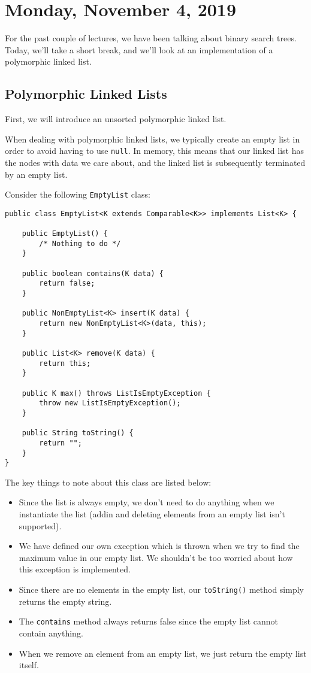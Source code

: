 \section{Monday, November 4, 2019}

For the past couple of lectures, we have been talking about binary search trees. Today, we'll take a short break, and we'll look at an implementation of a polymorphic linked list.

\subsection{Polymorphic Linked Lists}

First, we will introduce an unsorted polymorphic linked list.

When dealing with polymorphic linked lists, we typically create an empty list in order to avoid having to use \verb!null!. In memory, this means that our linked list has the nodes with data we care about, and the linked list is subsequently terminated by an empty list. 

Consider the following \verb!EmptyList! class:


\begin{lstlisting}
public class EmptyList<K extends Comparable<K>> implements List<K> {
	
	public EmptyList() {
		/* Nothing to do */
	}
	
	public boolean contains(K data) {
		return false;
	}

	public NonEmptyList<K> insert(K data) {
		return new NonEmptyList<K>(data, this);
	}

	public List<K> remove(K data) {
		return this;
	}

	public K max() throws ListIsEmptyException {
		throw new ListIsEmptyException();
	}
	
	public String toString() {
		return "";
	}
}
\end{lstlisting}

The key things to note about this class are listed below:
\begin{itemize}
    \item Since the list is always empty, we don't need to do anything when we instantiate the list (addin and deleting elements from an empty list isn't supported).
    \item We have defined our own exception which is thrown when we try to find the maximum value in our empty list. We shouldn't be too worried about how this exception is implemented.
    \item Since there are no elements in the empty list, our \verb!toString()! method simply returns the empty string.
    \item The \verb!contains! method always returns false since the empty list cannot contain anything.
    \item When we remove an element from an empty list, we just return the empty list itself.
\end{itemize}


